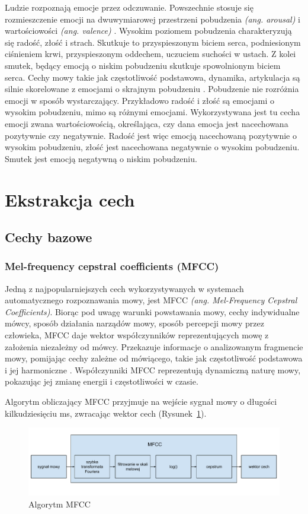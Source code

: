 \documentclass[a4paper,12pt,twoside,openany]{report}
\newcommand{\ang}[1]{\textit{(ang. #1)}}
\newcommand{\Rys}[1]{(Rysunek~\ref{#1})}
\begin{document}
Ludzie rozpoznają emocje przez odczuwanie. 
Powszechnie stosuje się rozmieszczenie emocji na dwuwymiarowej przestrzeni pobudzenia \ang{arousal} i wartościowości \ang{valence} \cite{Fernandez2004}.
Wysokim poziomem pobudzenia charakteryzują się radość, złość i strach. 
Skutkuje to przyspieszonym biciem serca, podniesionym ciśnieniem krwi, przyspieszonym oddechem, uczuciem suchości w ustach.
Z kolei smutek, będący emocją o niskim pobudzeniu skutkuje spowolnionym biciem serca.
Cechy mowy takie jak częstotliwość podstawowa, dynamika, artykulacja są silnie skorelowane z emocjami o skrajnym pobudzeniu \cite{Cahn1990}.
Pobudzenie nie rozróżnia emocji w sposób wystarczający. 
Przykładowo radość i złość są emocjami o wysokim pobudzeniu, mimo są różnymi emocjami.
Wykorzystywana jest tu cecha emocji zwana wartościowością, określająca, czy dana emocja jest nacechowana pozytywnie czy negatywnie.
Radość jest więc emocją nacechowaną pozytywnie o wysokim pobudzeniu, złość jest nacechowana negatywnie o wysokim pobudzeniu.
Smutek jest emocją negatywną o niskim pobudzeniu.


\section{Ekstrakcja cech}
\subsection{Cechy bazowe}
\subsubsection{Mel-frequency cepstral coefficients (MFCC)}
Jedną z najpopularniejszych cech wykorzystywanych w systemach automatycznego rozpoznawania mowy,
jest MFCC \ang{Mel-Frequency Cepstral Coefficients}.
Biorąc pod uwagę warunki powstawania mowy, cechy indywidualne mówcy, sposób działania narządów mowy, sposób percepcji mowy przez człowieka,
MFCC daje wektor współczynników reprezentujących mowę z założenia niezależny od mówcy. 
Przekazuje informacje o analizowanym fragmencie mowy, pomijając cechy zależne od mówiącego, takie jak częstotliwość podstawowa i jej harmoniczne \cite{Hossan2013}.
Współczynniki MFCC reprezentują dynamiczną naturę mowy, pokazując jej zmianę energii i częstotliwości w czasie.

Algorytm obliczający MFCC przyjmuje na wejście sygnał mowy o długości kilkudziesięciu ms,
zwracając wektor cech \Rys{rys:mgcc:schemat}.
\begin{figure}[h]
	\centering
	\includegraphics[width=\textwidth]{mfcc-schemat}
	\caption{Algorytm MFCC}
	\label{rys:mgcc:schemat}
\end{figure}
\end{document}
